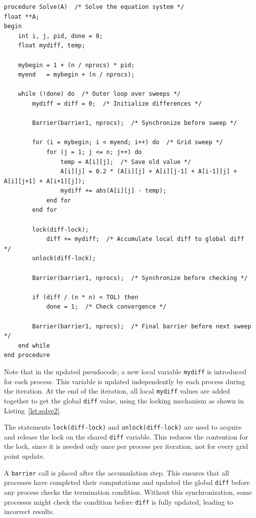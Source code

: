 \documentclass[12pt]{book}
\begin{document}
\begin{lstlisting}[style=cppstyle, caption={Updated Solve Function}, captionpos=b, label={lst:solve2}]
procedure Solve(A)  /* Solve the equation system */
float **A;
begin
    int i, j, pid, done = 0;
    float mydiff, temp;

    mybegin = 1 + (n / nprocs) * pid;
    myend   = mybegin + (n / nprocs);

    while (!done) do  /* Outer loop over sweeps */
        mydiff = diff = 0;  /* Initialize differences */

        Barrier(barrier1, nprocs);  /* Synchronize before sweep */

        for (i = mybegin; i < myend; i++) do  /* Grid sweep */
            for (j = 1; j <= n; j++) do
                temp = A[i][j];  /* Save old value */
                A[i][j] = 0.2 * (A[i][j] + A[i][j-1] + A[i-1][j] + A[i][j+1] + A[i+1][j]);
                mydiff += abs(A[i][j] - temp);
            end for
        end for

        lock(diff-lock);
            diff += mydiff;  /* Accumulate local diff to global diff */
        unlock(diff-lock);

        Barrier(barrier1, nprocs);  /* Synchronize before checking */

        if (diff / (n * n) < TOL) then
            done = 1;  /* Check convergence */
        
        Barrier(barrier1, nprocs);  /* Final barrier before next sweep */
    end while
end procedure
\end{lstlisting}
Note that in the updated pseudocode, a new local variable \texttt{mydiff} is introduced for each process. This variable is updated independently by each process during the iteration. At the end of the iteration, all local \texttt{mydiff} values are added together to get the global \texttt{diff} value, using the locking mechanism as shown in Listing~\ref{lst:solve2}.

The statements \texttt{lock(diff-lock)} and \texttt{unlock(diff-lock)} are used to acquire and release the lock on the shared \texttt{diff} variable. This reduces the contention for the lock, since it is needed only once per process per iteration, not for every grid point update.

A \texttt{barrier} call is placed after the accumulation step. This ensures that all processes have completed their computations and updated the global \texttt{diff} before any process checks the termination condition. Without this synchronization, some processes might check the condition before \texttt{diff} is fully updated, leading to incorrect results.
\end{document}
